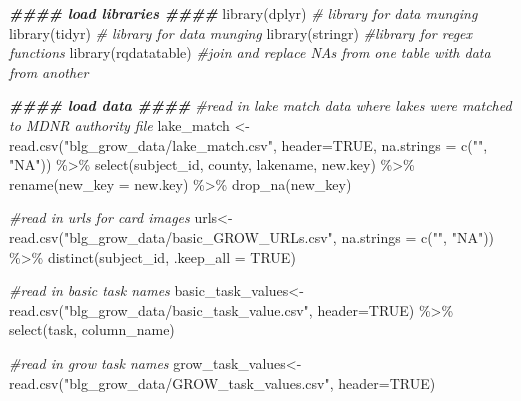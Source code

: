 \documentclass[
]{article}
\newenvironment{Shaded}{\begin{snugshade}}{\end{snugshade}}
\newcommand{\AttributeTok}[1]{\textcolor[rgb]{0.77,0.63,0.00}{#1}}
\newcommand{\CommentTok}[1]{\textcolor[rgb]{0.56,0.35,0.01}{\textit{#1}}}
\newcommand{\ConstantTok}[1]{\textcolor[rgb]{0.00,0.00,0.00}{#1}}
\newcommand{\DocumentationTok}[1]{\textcolor[rgb]{0.56,0.35,0.01}{\textbf{\textit{#1}}}}
\newcommand{\FunctionTok}[1]{\textcolor[rgb]{0.00,0.00,0.00}{#1}}
\newcommand{\NormalTok}[1]{#1}
\newcommand{\OtherTok}[1]{\textcolor[rgb]{0.56,0.35,0.01}{#1}}
\newcommand{\SpecialCharTok}[1]{\textcolor[rgb]{0.00,0.00,0.00}{#1}}
\newcommand{\StringTok}[1]{\textcolor[rgb]{0.31,0.60,0.02}{#1}}
\begin{document}
\begin{Shaded}
\begin{Highlighting}[]
\DocumentationTok{\#\#\#\# load libraries \#\#\#\# }
\FunctionTok{library}\NormalTok{(dplyr) }\CommentTok{\# library for data munging }
\FunctionTok{library}\NormalTok{(tidyr) }\CommentTok{\# library for data munging }
\FunctionTok{library}\NormalTok{(stringr) }\CommentTok{\#library for regex functions }
\FunctionTok{library}\NormalTok{(rqdatatable) }\CommentTok{\#join and replace NAs from one table with data from another }

\DocumentationTok{\#\#\#\# load data \#\#\#\# }
\CommentTok{\#read in lake match data where lakes were matched to MDNR authority file   }
\NormalTok{lake\_match }\OtherTok{\textless{}{-}}\FunctionTok{read.csv}\NormalTok{(}\StringTok{"blg\_grow\_data/lake\_match.csv"}\NormalTok{, }\AttributeTok{header=}\ConstantTok{TRUE}\NormalTok{, }\AttributeTok{na.strings =} \FunctionTok{c}\NormalTok{(}\StringTok{""}\NormalTok{, }\StringTok{"NA"}\NormalTok{)) }\SpecialCharTok{\%\textgreater{}\%}
  \FunctionTok{select}\NormalTok{(subject\_id, county, lakename, }\StringTok{\textquotesingle{}new.key\textquotesingle{}}\NormalTok{) }\SpecialCharTok{\%\textgreater{}\%}
  \FunctionTok{rename}\NormalTok{(}\AttributeTok{new\_key =} \StringTok{\textquotesingle{}new.key\textquotesingle{}}\NormalTok{) }\SpecialCharTok{\%\textgreater{}\%}
  \FunctionTok{drop\_na}\NormalTok{(}\StringTok{\textquotesingle{}new\_key\textquotesingle{}}\NormalTok{)}

\CommentTok{\#read in urls for card images }
\NormalTok{urls}\OtherTok{\textless{}{-}}\FunctionTok{read.csv}\NormalTok{(}\StringTok{"blg\_grow\_data/basic\_GROW\_URLs.csv"}\NormalTok{, }\AttributeTok{na.strings =} \FunctionTok{c}\NormalTok{(}\StringTok{""}\NormalTok{, }\StringTok{"NA"}\NormalTok{))  }\SpecialCharTok{\%\textgreater{}\%} 
  \FunctionTok{distinct}\NormalTok{(subject\_id, }\AttributeTok{.keep\_all =} \ConstantTok{TRUE}\NormalTok{) }

\CommentTok{\#read in basic task names}
\NormalTok{basic\_task\_values}\OtherTok{\textless{}{-}}\FunctionTok{read.csv}\NormalTok{(}\StringTok{"blg\_grow\_data/basic\_task\_value.csv"}\NormalTok{, }\AttributeTok{header=}\ConstantTok{TRUE}\NormalTok{) }\SpecialCharTok{\%\textgreater{}\%}
  \FunctionTok{select}\NormalTok{(task, column\_name)}

\CommentTok{\#read in grow task names }
\NormalTok{grow\_task\_values}\OtherTok{\textless{}{-}}\FunctionTok{read.csv}\NormalTok{(}\StringTok{"blg\_grow\_data/GROW\_task\_values.csv"}\NormalTok{, }\AttributeTok{header=}\ConstantTok{TRUE}\NormalTok{)}


\end{Highlighting}
\end{Shaded}
\end{document}
